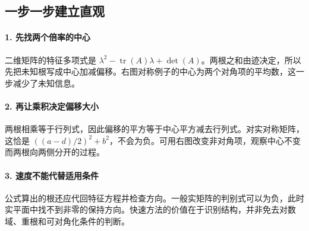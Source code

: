 \subsection*{一步一步建立直观}

\paragraph{1. 先找两个倍率的中心}

二维矩阵的特征多项式是 $\lambda^2-\operatorname{tr}(A)\lambda+\det(A)$。两根之和由迹决定，所以先把未知根写成中心加减偏移。右图对称例子的中心为两个对角项的平均数，这一步减少了未知信息。



\paragraph{2. 再让乘积决定偏移大小}

两根相乘等于行列式，因此偏移的平方等于中心平方减去行列式。对实对称矩阵，这恰是 $((a-d)/2)^2+b^2$，不会为负。可用右图改变非对角项，观察中心不变而两根向两侧分开的过程。



\paragraph{3. 速度不能代替适用条件}

公式算出的根还应代回特征方程并检查方向。一般实矩阵的判别式可以为负，此时实平面中找不到非零的保持方向。快速方法的价值在于识别结构，并非免去对数域、重根和可对角化条件的判断。
